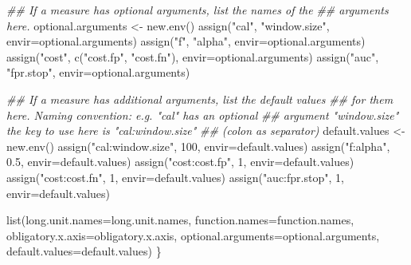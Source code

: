 \documentclass[
  letterpaper,
  DIV=11,
  numbers=noendperiod]{scrartcl}
\newenvironment{Shaded}{\begin{snugshade}}{\end{snugshade}}
\newcommand{\AttributeTok}[1]{\textcolor[rgb]{0.40,0.45,0.13}{#1}}
\newcommand{\DecValTok}[1]{\textcolor[rgb]{0.68,0.00,0.00}{#1}}
\newcommand{\DocumentationTok}[1]{\textcolor[rgb]{0.37,0.37,0.37}{\textit{#1}}}
\newcommand{\FloatTok}[1]{\textcolor[rgb]{0.68,0.00,0.00}{#1}}
\newcommand{\FunctionTok}[1]{\textcolor[rgb]{0.28,0.35,0.67}{#1}}
\newcommand{\NormalTok}[1]{\textcolor[rgb]{0.00,0.23,0.31}{#1}}
\newcommand{\OtherTok}[1]{\textcolor[rgb]{0.00,0.23,0.31}{#1}}
\newcommand{\StringTok}[1]{\textcolor[rgb]{0.13,0.47,0.30}{#1}}
\begin{document}
\begin{Shaded}
\begin{Highlighting}[]
    \DocumentationTok{\#\# If a measure has optional arguments, list the names of the}
    \DocumentationTok{\#\# arguments here.}
\NormalTok{    optional.arguments }\OtherTok{\textless{}{-}} \FunctionTok{new.env}\NormalTok{()}
    \FunctionTok{assign}\NormalTok{(}\StringTok{"cal"}\NormalTok{, }\StringTok{"window.size"}\NormalTok{, }\AttributeTok{envir=}\NormalTok{optional.arguments)}
    \FunctionTok{assign}\NormalTok{(}\StringTok{"f"}\NormalTok{, }\StringTok{"alpha"}\NormalTok{, }\AttributeTok{envir=}\NormalTok{optional.arguments)}
    \FunctionTok{assign}\NormalTok{(}\StringTok{"cost"}\NormalTok{, }\FunctionTok{c}\NormalTok{(}\StringTok{"cost.fp"}\NormalTok{, }\StringTok{"cost.fn"}\NormalTok{), }\AttributeTok{envir=}\NormalTok{optional.arguments)}
    \FunctionTok{assign}\NormalTok{(}\StringTok{"auc"}\NormalTok{, }\StringTok{"fpr.stop"}\NormalTok{, }\AttributeTok{envir=}\NormalTok{optional.arguments)}
        
    \DocumentationTok{\#\# If a measure has additional arguments, list the default values}
    \DocumentationTok{\#\# for them here. Naming convention: e.g. "cal" has an optional}
    \DocumentationTok{\#\# argument "window.size" the key to use here is "cal:window.size"}
    \DocumentationTok{\#\# (colon as separator)}
\NormalTok{    default.values }\OtherTok{\textless{}{-}} \FunctionTok{new.env}\NormalTok{()}
    \FunctionTok{assign}\NormalTok{(}\StringTok{"cal:window.size"}\NormalTok{, }\DecValTok{100}\NormalTok{, }\AttributeTok{envir=}\NormalTok{default.values)}
    \FunctionTok{assign}\NormalTok{(}\StringTok{"f:alpha"}\NormalTok{, }\FloatTok{0.5}\NormalTok{, }\AttributeTok{envir=}\NormalTok{default.values)}
    \FunctionTok{assign}\NormalTok{(}\StringTok{"cost:cost.fp"}\NormalTok{, }\DecValTok{1}\NormalTok{, }\AttributeTok{envir=}\NormalTok{default.values)}
    \FunctionTok{assign}\NormalTok{(}\StringTok{"cost:cost.fn"}\NormalTok{, }\DecValTok{1}\NormalTok{, }\AttributeTok{envir=}\NormalTok{default.values)}
    \FunctionTok{assign}\NormalTok{(}\StringTok{"auc:fpr.stop"}\NormalTok{, }\DecValTok{1}\NormalTok{, }\AttributeTok{envir=}\NormalTok{default.values) }
    
    \FunctionTok{list}\NormalTok{(}\AttributeTok{long.unit.names=}\NormalTok{long.unit.names, }\AttributeTok{function.names=}\NormalTok{function.names,}
         \AttributeTok{obligatory.x.axis=}\NormalTok{obligatory.x.axis,}
         \AttributeTok{optional.arguments=}\NormalTok{optional.arguments,}
         \AttributeTok{default.values=}\NormalTok{default.values)}
\NormalTok{\}}


\end{Highlighting}
\end{Shaded}
\end{document}
